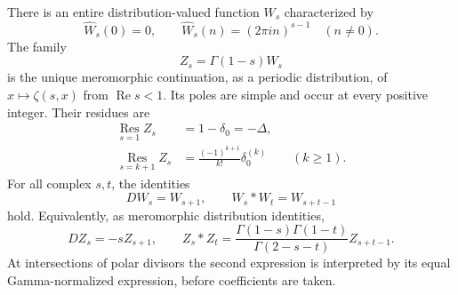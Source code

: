 \begin{theorem}
\label{per:thm:family}
There is an entire distribution-valued function $W_s$ characterized by
\begin{equation}\label{per:eq:W}
 \widehat W_s(0)=0,\qquad
 \widehat W_s(n)=(2\pi i n)^{s-1}\quad(n\ne0).
\end{equation}
The family
\begin{equation}\label{per:eq:Z}
 Z_s=\Gamma(1-s)W_s
\end{equation}
is the unique meromorphic continuation, as a periodic distribution, of
$x\mapsto\zeta(s,x)$ from $\operatorname{Re}s<1$. Its poles are simple
and occur at every positive integer. Their residues are
\begin{align}
 \operatorname*{Res}_{s=1} Z_s&=1-\delta_0=-\Delta,
 \label{per:eq:res1}\\
 \operatorname*{Res}_{s=k+1} Z_s
 &=\frac{(-1)^{k+1}}{k!}\delta_0^{(k)}\qquad(k\ge1).
 \label{per:eq:resk}
\end{align}
For all complex $s,t$, the identities
\begin{equation}\label{per:eq:group}
 DW_s=W_{s+1},\qquad W_s*W_t=W_{s+t-1}
\end{equation}
hold. Equivalently, as meromorphic distribution identities,
\begin{equation}\label{per:eq:meroconv}
 DZ_s=-sZ_{s+1},\qquad
 Z_s*Z_t=\frac{\Gamma(1-s)\Gamma(1-t)}{\Gamma(2-s-t)}Z_{s+t-1}.
\end{equation}
At intersections of polar divisors the second expression is interpreted
by its equal Gamma-normalized expression, before coefficients are taken.
\end{theorem}

